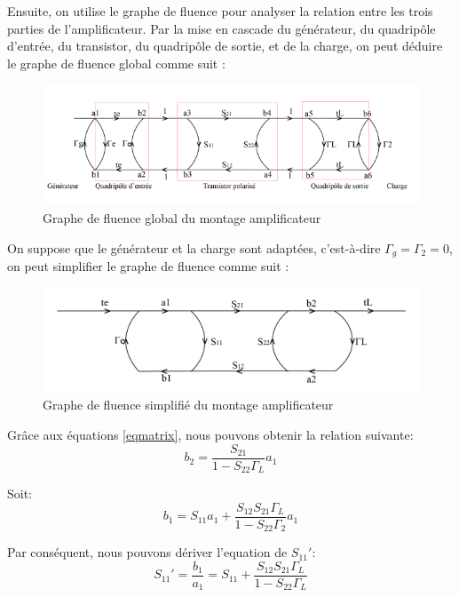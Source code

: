 \documentclass[french]{article}
\begin{document}
Ensuite, on utilise le graphe de fluence pour analyser la relation entre les trois parties de l'amplificateur. Par la mise en cascade du générateur, du quadripôle d’entrée, du transistor, du quadripôle de sortie, et de la charge, on peut déduire le graphe de fluence global comme suit :

\begin{figure}[H]
	\centering
	\includegraphics[width=0.9\linewidth]{../5SynthAmp/flux_global}
	\caption{Graphe de fluence global du montage amplificateur}
	\label{fig:flux_global}
\end{figure}

On suppose que le générateur et la charge sont adaptées, c’est-à-dire $\Gamma_{g}=\Gamma_{2}=0$, on peut simplifier le graphe de fluence comme suit :

\begin{figure}[H]
	\centering
	\includegraphics[width=0.9\linewidth]{../5SynthAmp/flux_simple}
	\caption{Graphe de fluence simplifié du montage amplificateur}
	\label{fig:flux_simple}
\end{figure}

Grâce aux équations \ref{eqmatrix}, nous pouvons obtenir la relation suivante:
\begin{equation}
	b_{2}=\frac{S_{21}}{1-S_{22}\Gamma_{L}}a_{1}
\end{equation}

Soit: 
\begin{equation}
	b_{1}=S_{11}a_{1}+\frac{S_{12}S_{21}\Gamma_{L}}{1-S_{22}\Gamma_{2}}a_{1}
\end{equation}

Par conséquent, nous pouvons dériver l'equation de ${S_{11}}'$:
\begin{equation}
	{S_{11}}'=\frac{b_{1}}{a_{1}}
	=S_{11}+\frac{S_{12}S_{21}\Gamma_{L}}{1-S_{22}\Gamma_{L}}
\end{equation}
\end{document}
